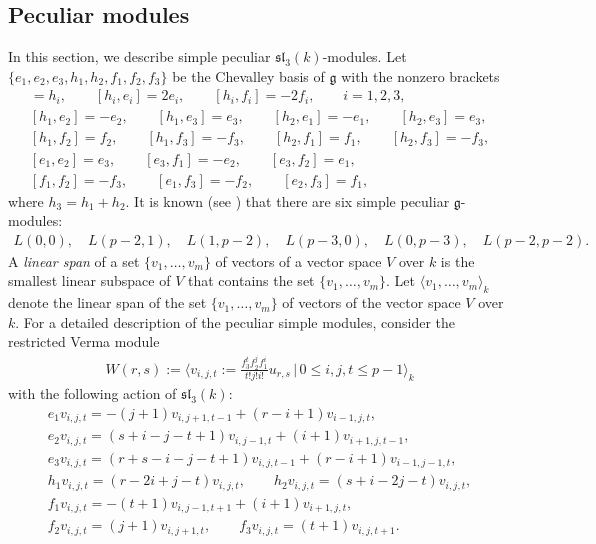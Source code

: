 \documentclass[10pt,a4paper]{amsart}
\numberwithin{equation}{section}
\begin{document}
\subsection{Peculiar modules}
\label{ss22}
In this section, we describe simple peculiar $\mathfrak{sl}_3(k)$-modules.
Let $\{e_1,e_2,e_3,h_1,h_2,f_1,f_2,f_3\}$ be the Chevalley basis of $\mathfrak{g}$ with the nonzero brackets
\begin{gather*}
[e_i,f_i]=h_i,\qquad [h_i,e_i]=2e_i,\qquad [h_i,f_i]=-2f_i,\qquad i=1,2,3,
\\
[h_1,e_2]=-e_2,\qquad [h_1,e_3]=e_3,\qquad [h_2,e_1]=-e_1,\qquad [h_2,e_3]=e_3,
\\
[h_1,f_2]=f_2,\qquad [h_1,f_3]=-f_3,\qquad [h_2,f_1]=f_1,\qquad [h_2,f_3]=-f_3,
\\
[e_1,e_2]=e_3,\qquad [e_3,f_1]=-e_2,\qquad [e_3,f_2]=e_1,
\\
[f_1,f_2]=-f_3,\qquad [e_1,f_3]=-f_2,\qquad [e_2,f_3]=f_1,
\end{gather*}
where $h_3=h_1+h_2$.
It is known (see \cite[p.~145]{DI02}) that there are six simple peculiar $\mathfrak{g}$-modules:
\begin{gather*}
L(0,0),\quad L(p-2,1),\quad L(1,p-2),\quad L(p-3,0),\quad L(0,p-3),\quad L(p-2,p-2).
\end{gather*}
A {\it linear span} of a set $\{v_1,\dots,v_m\}$ of vectors of a vector space $V$ over $k$ is the smallest linear subspace of $V$ that contains the set $\{v_1,\dots,v_m\}$. Let $\langle v_1,\dots,v_m\rangle_{k}$ denote the linear span of the set $\{v_1,\dots,v_m\}$ of vectors of the vector space $V$ over $k$. For a detailed description of the peculiar simple modules, consider the restricted Verma module
\begin{gather*}
W(r,s):=\bigg\langle v_{i,j,t}:=\frac{f_3^tf_2^jf_1^i}{t!j!i!}u_{r,s}\,\bigg|\,0\leq i,j,t\leq p-1\bigg\rangle_{k}
\end{gather*}
with the following action of $\mathfrak{sl}_3(k)$:
\begin{gather*}
e_1v_{i,j,t}=-(j+1)v_{i,j+1,t-1}+(r-i+1)v_{i-1,j,t},
\\
e_2v_{i,j,t}=(s+i-j-t+1)v_{i,j-1,t}+(i+1)v_{i+1,j,t-1},
\\
e_3v_{i,j,t}=(r+s-i-j-t+1)v_{i,j,t-1}+(r-i+1)v_{i-1,j-1,t},
\\
h_1v_{i,j,t}=(r-2i+j-t)v_{i,j,t},
\qquad
h_2v_{i,j,t}=(s+i-2j-t)v_{i,j,t},
\\
f_1v_{i,j,t}=-(t+1)v_{i,j-1,t+1}+(i+1)v_{i+1,j,t},
\\
f_2v_{i,j,t}=(j+1)v_{i,j+1,t},
\qquad
f_3v_{i,j,t}=(t+1)v_{i,j,t+1}.
\end{gather*}
\end{document}
